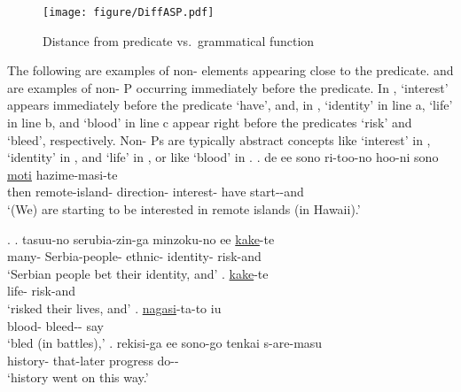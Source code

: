 \begin{figure}
	\begin{center}
	\texttt{[image: figure/DiffASP.pdf]}
	\caption{Distance from predicate vs.~grammatical function}
	\label{WO:Prep:New:DiffASPF}
	\end{center}
\end{figure}


The following are examples of non- elements appearing close to the predicate.
\Next and \NNext are examples of non- P occurring immediately before the predicate.
In \Next,
 `interest' appears immediately before the predicate  `have',
and, in \NNext,
 `identity' in line a,  `life' in line b, and  `blood' in line c appear right before the predicates  `risk' and  `bleed', respectively. Non- Ps are typically abstract concepts like  `interest' in \Next,  `identity' in \NNext[a], and  `life' in \NNext[b], or
 like  `blood' in \NNext[c].
%
\exg. de ee sono ri-too-no hoo-ni sono  \ul{moti} hazime-masi-te \\
		then \ab{fl}  remote-island- direction-  interest- have start--and \\
	`(We) are starting to be interested in remote islands (in Hawaii).'

\ex.\label{S00M0199_inoti}
 \ag. tasuu-no serubia-zin-ga minzoku-no ee  \ul{kake}-te \\
 	many- Serbia-people- ethnic-  identity- risk-and \\
	`Serbian people bet their identity, and'
 \bg.  \ul{kake}-te \\
 		life- risk-and \\
		`risked their lives, and'
 \bg.  \ul{nagasi}-ta-to iu \\
 		blood- bleed-- say \\
		`bled (in battles),'
 \bg. rekisi-ga ee sono-go tenkai s-are-masu \\
 	history-  that-later progress do-- \\
	`history went on this way.'

